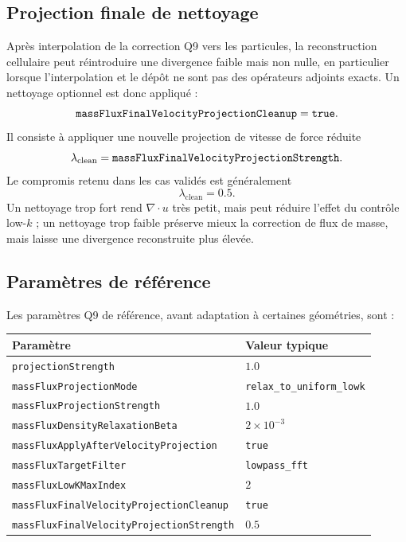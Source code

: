 \documentclass[11pt,a4paper]{article}
\begin{document}
\subsection{Projection finale de nettoyage}

Après interpolation de la correction Q9 vers les particules, la reconstruction cellulaire peut réintroduire une divergence faible mais non nulle, en particulier lorsque l'interpolation et le dépôt ne sont pas des opérateurs adjoints exacts. Un nettoyage optionnel est donc appliqué :
\begin{equation}
  \verb|massFluxFinalVelocityProjectionCleanup|=\verb|true|.
\end{equation}
Il consiste à appliquer une nouvelle projection de vitesse de force réduite
\begin{equation}
  \lambda_{\mathrm{clean}}=\verb|massFluxFinalVelocityProjectionStrength|.
\end{equation}
Le compromis retenu dans les cas validés est généralement
\begin{equation}
  \lambda_{\mathrm{clean}}=0.5.
\end{equation}
Un nettoyage trop fort rend $\nabla\cdot u$ très petit, mais peut réduire l'effet du contrôle low-$k$ ; un nettoyage trop faible préserve mieux la correction de flux de masse, mais laisse une divergence reconstruite plus élevée.

\subsection{Paramètres de référence}

Les paramètres Q9 de référence, avant adaptation à certaines géométries, sont :
\begin{center}
\begin{tabular}{ll}
\toprule
Paramètre & Valeur typique \\
\midrule
\verb|projectionStrength| & $1.0$ \\
\verb|massFluxProjectionMode| & \verb|relax_to_uniform_lowk| \\
\verb|massFluxProjectionStrength| & $1.0$ \\
\verb|massFluxDensityRelaxationBeta| & $2\times10^{-3}$ \\
\verb|massFluxApplyAfterVelocityProjection| & \verb|true| \\
\verb|massFluxTargetFilter| & \verb|lowpass_fft| \\
\verb|massFluxLowKMaxIndex| & $2$ \\
\verb|massFluxFinalVelocityProjectionCleanup| & \verb|true| \\
\verb|massFluxFinalVelocityProjectionStrength| & $0.5$ \\
\bottomrule
\end{tabular}
\end{center}
\end{document}
